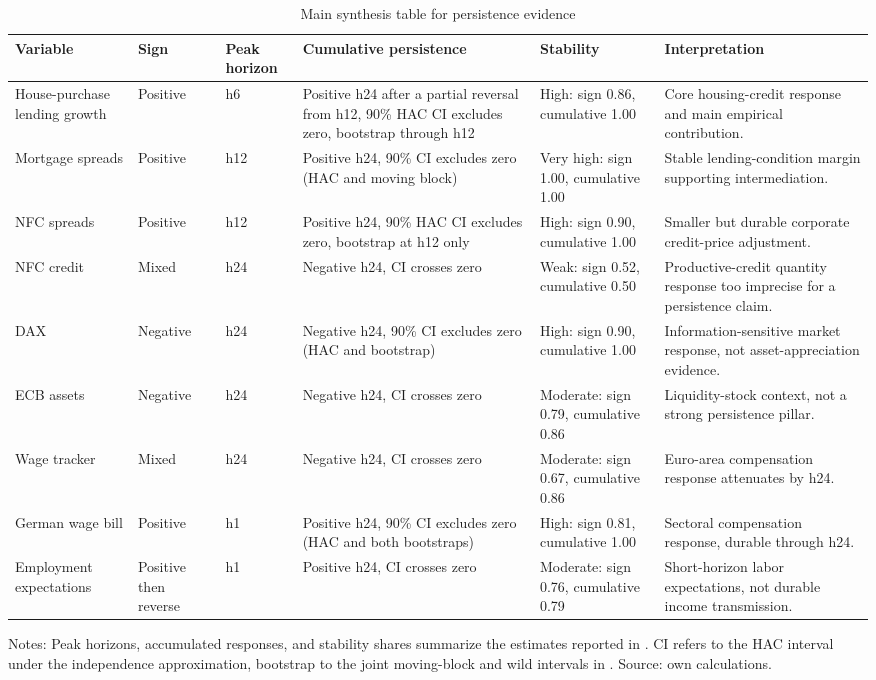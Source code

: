 \begin{table}[htbp]
  \centering
  \caption{Main synthesis table for persistence evidence}
  \label{tab:persistence-synthesis}
  \scriptsize
  \setlength{\tabcolsep}{3pt}
  \begin{tabularx}{\textwidth}{@{}>{\raggedright\arraybackslash}p{}>{\raggedright\arraybackslash}p{}>{\raggedright\arraybackslash}p{}>{\raggedright\arraybackslash}p{}>{\raggedright\arraybackslash}p{}>{\raggedright\arraybackslash}X@{}}
    \toprule
    Variable & Sign & Peak horizon & Cumulative persistence & Stability & Interpretation \\
    \midrule
    House-purchase lending growth & Positive & h6 & Positive h24 after a partial reversal from h12, 90\% HAC CI excludes zero, bootstrap through h12 & High: sign 0.86, cumulative 1.00 & Core housing-credit response and main empirical contribution. \\
    Mortgage spreads & Positive & h12 & Positive h24, 90\% CI excludes zero (HAC and moving block) & Very high: sign 1.00, cumulative 1.00 & Stable lending-condition margin supporting intermediation. \\
    NFC spreads & Positive & h12 & Positive h24, 90\% HAC CI excludes zero, bootstrap at h12 only & High: sign 0.90, cumulative 1.00 & Smaller but durable corporate credit-price adjustment. \\
    NFC credit & Mixed & h24 & Negative h24, CI crosses zero & Weak: sign 0.52, cumulative 0.50 & Productive-credit quantity response too imprecise for a persistence claim. \\
    DAX & Negative & h24 & Negative h24, 90\% CI excludes zero (HAC and bootstrap) & High: sign 0.90, cumulative 1.00 & Information-sensitive market response, not asset-appreciation evidence. \\
    ECB assets & Negative & h24 & Negative h24, CI crosses zero & Moderate: sign 0.79, cumulative 0.86 & Liquidity-stock context, not a strong persistence pillar. \\
    Wage tracker & Mixed & h24 & Negative h24, CI crosses zero & Moderate: sign 0.67, cumulative 0.86 & Euro-area compensation response attenuates by h24. \\
    German wage bill & Positive & h1 & Positive h24, 90\% CI excludes zero (HAC and both bootstraps) & High: sign 0.81, cumulative 1.00 & Sectoral compensation response, durable through h24. \\
    Employment expectations & Positive then reverse & h1 & Positive h24, CI crosses zero & Moderate: sign 0.76, cumulative 0.79 & Short-horizon labor expectations, not durable income transmission. \\
    \bottomrule
  \end{tabularx}
  \vspace{0.25em}
  {\footnotesize Notes: Peak horizons, accumulated responses, and stability shares summarize the estimates reported in . CI refers to the HAC interval under the independence approximation, bootstrap to the joint moving-block and wild intervals in . Source: own calculations.}
\end{table}
